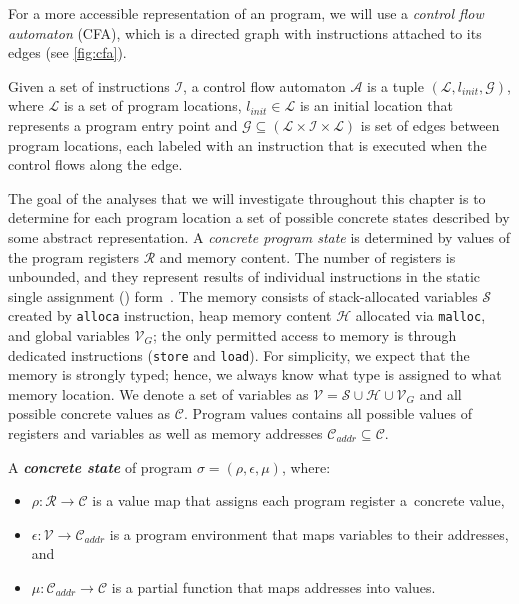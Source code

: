 For a more accessible representation of an \llvm program, we will use a
\emph{control flow automaton} (CFA), which is a directed graph with \llvm
instructions attached to its edges (see \autoref{fig:cfa}).

\begin{definition}
    Given a set of instructions $\mathcal{I}$, a control flow automaton
    $\mathcal{A}$ is a tuple $(\mathcal{L}, l_{\textit{init}}, \mathcal{G})$,
    where $\mathcal{L}$ is a set of program locations, $l_{\textit{init}} \in
    \mathcal{L}$ is an initial location that represents a program entry point
    and $\mathcal{G} \subseteq (\mathcal{L} \times \mathcal{I} \times
    \mathcal{L})$ is set of edges between program locations, each labeled with
    an instruction that is executed when the control flows along the edge.
\end{definition}

The goal of the analyses that we will investigate throughout this chapter is to
determine for each program location a set of possible concrete states described
by some abstract representation. A \emph{concrete program state} is determined
by values of the program registers $\mathcal{R}$ and memory content. The number of \llvm
registers is unbounded, and they represent results of individual instructions
in the static single assignment (\ssa) form~\cite{Cytron1991}. The memory
consists of stack-allocated variables $\mathcal{S}$ created by \texttt{alloca}
instruction, heap memory content $\mathcal{H}$ allocated via \texttt{malloc}, and
global variables $\mathcal{V}_{\textit{G}}$; the only permitted access to memory is
through dedicated instructions (\texttt{store} and \texttt{load}).  For
simplicity, we expect that the memory is strongly typed; hence, we always know
what type is assigned to what memory location.
We denote a set of variables as $\mathcal{V} = \mathcal{S} \cup \mathcal{H}
\cup \mathcal{V}_{\textit{G}}$ and all possible concrete values as
$\mathcal{C}$.  Program values contains all possible values of registers and
variables as well as memory addresses $\mathcal{C}_{\textit{addr}} \subseteq
\mathcal{C}$.

\begin{definition}
    A \textbf{\emph{concrete state}} of \llvm program $\sigma = (\rho, \epsilon, \mu)$, where:
\begin{itemize}
    \item $\rho \colon \mathcal{R} \to \mathcal{C}$ is a value map that assigns each program
        register a~concrete value,
    \item $\epsilon \colon \mathcal{V} \to \mathcal{C}_{\textit{addr}}$ is a
        program environment that maps variables to their addresses, and
    \item $\mu \colon \mathcal{C}_{\textit{addr}} \to \mathcal{C}$ is a
        partial function that maps addresses into values.
\end{itemize}
\end{definition}

